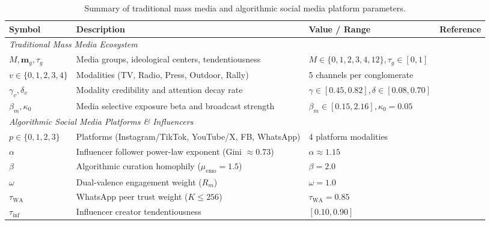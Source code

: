 \documentclass[11pt,a4paper]{article}
\begin{document}
\begin{table}[htbp]
\centering
\caption{Summary of traditional mass media and algorithmic social media platform parameters.}
\label{tab:supp_media_parameters}
\footnotesize
\setlength{\tabcolsep}{4.5pt}
\begin{tabular}{lp{5.1cm}p{3.6cm}p{3.8cm}}
\toprule
\textbf{Symbol} & \textbf{Description} & \textbf{Value / Range} & \textbf{Reference} \\
\midrule
\multicolumn{4}{l}{\textit{Traditional Mass Media Ecosystem}} \\
$M, \mathbf{m}_g, \tau_g$ & Media groups, ideological centers, tendentiousness & $M \in \{0, 1, 2, 3, 4, 12\}, \tau_g \in [0, 1]$ & \cite{mullainathan2005market, gentzkow2006media} \\
$v \in \{0, 1, 2, 3, 4\}$ & Modalities (TV, Radio, Press, Outdoor, Rally) & 5 channels per conglomerate & \cite{kantar2023inside, reuters2023digital} \\
$\gamma_v, \delta_v$ & Modality credibility and attention decay rate & $\gamma \in [0.45, 0.82], \delta \in [0.08, 0.70]$ & \cite{wu2007novelty, downs1972up} \\
$\beta_m, \kappa_0$ & Media selective exposure beta and broadcast strength & $\beta_m \in [0.15, 2.16], \kappa_0 = 0.05$ & \cite{dandekar2013biased, dellavigna2007fox} \\
\midrule
\multicolumn{4}{l}{\textit{Algorithmic Social Media Platforms \& Influencers}} \\
$p \in \{0, 1, 2, 3\}$ & Platforms (Instagram/TikTok, YouTube/X, FB, WhatsApp) & 4 platform modalities & \cite{reuters2023digital, cinelli2021echo} \\
$\alpha$ & Influencer follower power-law exponent (Gini $\approx 0.73$) & $\alpha \approx 1.15$ & \cite{barabasi1999emergence, bianconi2001competition} \\
$\beta$ & Algorithmic curation homophily ($\mu_{\text{emo}} = 1.5$) & $\beta = 2.0$ & \cite{brady2017emotion, vosoughi2018spread} \\
$\omega$ & Dual-valence engagement weight ($R_m$) & $\omega = 1.0$ & \cite{crockett2017moral, bail2018exposure} \\
$\tau_{\text{WA}}$ & WhatsApp peer trust weight ($K \le 256$) & $\tau_{\text{WA}} = 0.85$ & \cite{resende2019whatsapp, garimella2020images} \\
$\tau_{\mathrm{inf}}$ & Influencer creator tendentiousness & $[0.10, 0.90]$ & \cite{sasahara2021social, tucker2018social} \\
\bottomrule
\end{tabular}
\end{table}
\end{document}
